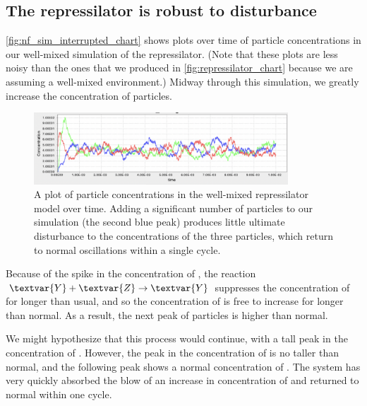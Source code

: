 \subsection{The repressilator is robust to disturbance}

\autoref{fig:nf_sim_interrupted_chart} shows plots over time of particle concentrations in our well-mixed simulation of the repressilator. (Note that these plots are less noisy than the ones that we produced in \autoref{fig:repressilator_chart} because we are assuming a well-mixed environment.) Midway through this simulation, we greatly increase the concentration of  particles.

\begin{figure}[h]
\centering
\mySfFamily
\includegraphics[width = 0.85\textwidth]{../images/nf_sim_interrupted_chart_spike.png}
\caption{A plot of particle concentrations in the well-mixed repressilator model over time. Adding a significant number of  particles to our simulation (the second blue peak) produces little ultimate disturbance to the concentrations of the three particles, which return to normal oscillations within a single cycle.}
\label{fig:nf_sim_interrupted_chart}
\end{figure}

Because of the spike in the concentration of , the reaction $\textvar{Y} + \textvar{Z} \rightarrow \textvar{Y}$ suppresses the concentration of  for longer than usual, and so the concentration of  is free to increase for longer than normal. As a result, the next peak of  particles is higher than normal.

We might hypothesize that this process would continue, with a tall peak in the concentration of . However, the peak in the concentration of  is no taller than normal, and the following peak shows a normal concentration of . The system has very quickly absorbed the blow of an increase in concentration of  and returned to normal within one cycle.

%

